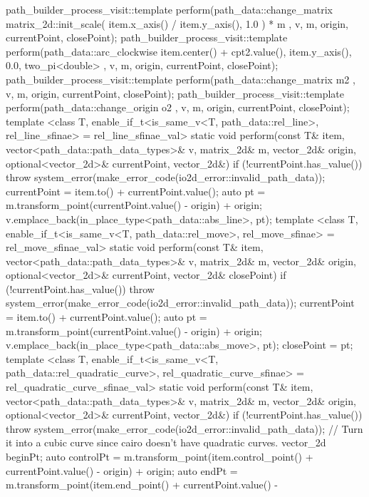 \begin{codeblock}
{{{        path_builder_process_visit::template perform(path_data::change_matrix{ matrix_2d::init_scale({ item.x_axis() / item.y_axis(), 1.0 }) * m }, v, m, origin, currentPoint, closePoint);
        path_builder_process_visit::template perform(path_data::arc_clockwise{ item.center() + cpt2.value(), item.y_axis(), 0.0, two_pi<double> }, v, m, origin, currentPoint, closePoint);
        path_builder_process_visit::template perform(path_data::change_matrix{ m2 }, v, m, origin, currentPoint, closePoint);
        path_builder_process_visit::template perform(path_data::change_origin{ o2 }, v, m, origin, currentPoint, closePoint);
      }
      template <class T, enable_if_t<is_same_v<T, path_data::rel_line>, rel_line_sfinae> = rel_line_sfinae_val>
      static void perform(const T& item, vector<path_data::path_data_types>& v, matrix_2d& m, vector_2d& origin, optional<vector_2d>& currentPoint, vector_2d&) {
        if (!currentPoint.has_value()) {
          throw system_error(make_error_code(io2d_error::invalid_path_data));
        }
        currentPoint = item.to() + currentPoint.value();
        auto pt = m.transform_point(currentPoint.value() - origin) + origin;
        v.emplace_back(in_place_type<path_data::abs_line>, pt);
      }
      template <class T, enable_if_t<is_same_v<T, path_data::rel_move>, rel_move_sfinae> = rel_move_sfinae_val>
      static void perform(const T& item, vector<path_data::path_data_types>& v, matrix_2d& m, vector_2d& origin, optional<vector_2d>& currentPoint, vector_2d& closePoint) {
        if (!currentPoint.has_value()) {
          throw system_error(make_error_code(io2d_error::invalid_path_data));
        }
        currentPoint = item.to() + currentPoint.value();
        auto pt = m.transform_point(currentPoint.value() - origin) + origin;
        v.emplace_back(in_place_type<path_data::abs_move>, pt);
        closePoint = pt;
      }
      template <class T, enable_if_t<is_same_v<T, path_data::rel_quadratic_curve>, rel_quadratic_curve_sfinae> = rel_quadratic_curve_sfinae_val>
      static void perform(const T& item, vector<path_data::path_data_types>& v, matrix_2d& m, vector_2d& origin, optional<vector_2d>& currentPoint, vector_2d&) {
        if (!currentPoint.has_value()) {
          throw system_error(make_error_code(io2d_error::invalid_path_data));
        }
        // Turn it into a cubic curve since cairo doesn't have quadratic curves.
        vector_2d beginPt;
        auto controlPt = m.transform_point(item.control_point() + currentPoint.value() -
          origin) + origin;
        auto endPt = m.transform_point(item.end_point() + currentPoint.value() -
}}}
\end{codeblock}
